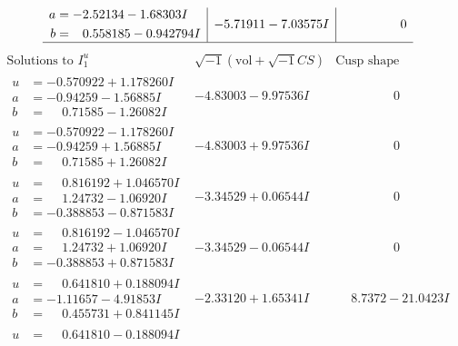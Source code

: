 \documentclass[1p]{elsarticle_modified}
\theoremstyle{definition}
\newcommand{\I}{\sqrt{-1}}
\begin{document}
$$\begin{array}{c|c|c}
\begin{aligned}
a &= -2.52134 - 1.68303 I \\
b &= \phantom{-}0.558185 - 0.942794 I\end{aligned}
 & -5.71911 - 7.03575 I & \phantom{-0.000000 } 0\\
 \hline 
 \end{array}$$\newpage$$\begin{array}{c|c|c}  
\text{Solutions to }I^u_{1}& \I (\text{vol} + \sqrt{-1}CS) & \text{Cusp shape}\\
 \hline 
\begin{aligned}
u &= -0.570922 + 1.178260 I \\
a &= -0.94259 - 1.56885 I \\
b &= \phantom{-}0.71585 - 1.26082 I\end{aligned}
 & -4.83003 - 9.97536 I & \phantom{-0.000000 } 0 \\ \hline\begin{aligned}
u &= -0.570922 - 1.178260 I \\
a &= -0.94259 + 1.56885 I \\
b &= \phantom{-}0.71585 + 1.26082 I\end{aligned}
 & -4.83003 + 9.97536 I & \phantom{-0.000000 } 0 \\ \hline\begin{aligned}
u &= \phantom{-}0.816192 + 1.046570 I \\
a &= \phantom{-}1.24732 - 1.06920 I \\
b &= -0.388853 - 0.871583 I\end{aligned}
 & -3.34529 + 0.06544 I & \phantom{-0.000000 } 0 \\ \hline\begin{aligned}
u &= \phantom{-}0.816192 - 1.046570 I \\
a &= \phantom{-}1.24732 + 1.06920 I \\
b &= -0.388853 + 0.871583 I\end{aligned}
 & -3.34529 - 0.06544 I & \phantom{-0.000000 } 0 \\ \hline\begin{aligned}
u &= \phantom{-}0.641810 + 0.188094 I \\
a &= -1.11657 - 4.91853 I \\
b &= \phantom{-}0.455731 + 0.841145 I\end{aligned}
 & -2.33120 + 1.65341 I & \phantom{-}8.7372 - 21.0423 I \\ \hline\begin{aligned}
u &= \phantom{-}0.641810 - 0.188094 I \\

\end{aligned}
\end{array}$$
\end{document}
